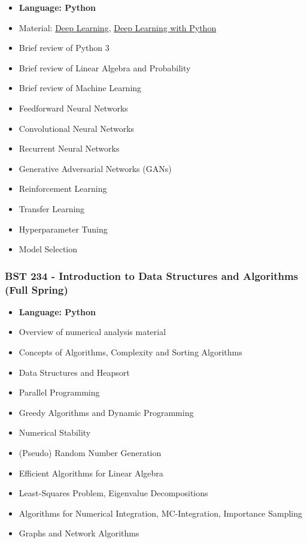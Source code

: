 \documentclass[
]{article}
\providecommand{\tightlist}{%
  \setlength{\itemsep}{0pt}\setlength{\parskip}{0pt}}
\begin{document}
\begin{itemize}
\tightlist
\item
  \textbf{Language: Python}
\item
  Material: \href{http://www.deeplearningbook.org/}{Deep Learning},
  \href{https://www.manning.com/books/deep-learning-with-python-second-edition?query=deep\%20learning\%20with\%20python\&gclid=Cj0KCQiA47GNBhDrARIsAKfZ2rB4TNLnN4OKdz7v98dkQOUrr7C0Oaitr2SpsTFkpJqS8nT0AgdN1HwaArijEALw_wcB}{Deep
  Learning with Python}
\item
  Brief review of Python 3
\item
  Brief review of Linear Algebra and Probability
\item
  Brief review of Machine Learning
\item
  Feedforward Neural Networks
\item
  Convolutional Neural Networks
\item
  Recurrent Neural Networks
\item
  Generative Adversarial Networks (GANs)
\item
  Reinforcement Learning
\item
  Transfer Learning
\item
  Hyperparameter Tuning
\item
  Model Selection
\end{itemize}

\hypertarget{bst-234---introduction-to-data-structures-and-algorithms-full-spring}{%
\subsubsection{BST 234 - Introduction to Data Structures and Algorithms
(Full
Spring)}\label{bst-234---introduction-to-data-structures-and-algorithms-full-spring}}

\begin{itemize}
\tightlist
\item
  \textbf{Language: Python}
\item
  Overview of numerical analysis material
\item
  Concepts of Algorithms, Complexity and Sorting Algorithms
\item
  Data Structures and Heapsort
\item
  Parallel Programming
\item
  Greedy Algorithms and Dynamic Programming
\item
  Numerical Stability
\item
  (Pseudo) Random Number Generation
\item
  Efficient Algorithms for Linear Algebra
\item
  Least-Squares Problem, Eigenvalue Decompositions
\item
  Algorithms for Numerical Integration, MC-Integration, Importance
  Sampling
\item
  Graphs and Network Algorithms
\end{itemize}
\end{document}
